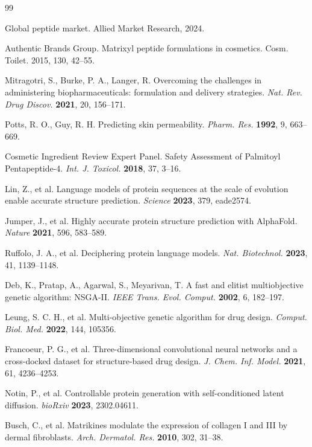 \documentclass[11pt,a4paper]{article}
\begin{document}
\begin{thebibliography}{99}

 Global peptide market. Allied Market Research, 2024.

 Authentic Brands Group. Matrixyl peptide formulations in cosmetics. Cosm. Toilet. 2015, 130, 42--55.

 Mitragotri, S., Burke, P. A., Langer, R. Overcoming the challenges in administering biopharmaceuticals: formulation and delivery strategies. \textit{Nat. Rev. Drug Discov.} \textbf{2021}, 20, 156--171.

 Potts, R. O., Guy, R. H. Predicting skin permeability. \textit{Pharm. Res.} \textbf{1992}, 9, 663--669.

 Cosmetic Ingredient Review Expert Panel. Safety Assessment of Palmitoyl Pentapeptide-4. \textit{Int. J. Toxicol.} \textbf{2018}, 37, 3--16.

 Lin, Z., et al. Language models of protein sequences at the scale of evolution enable accurate structure prediction. \textit{Science} \textbf{2023}, 379, eade2574.

 Jumper, J., et al. Highly accurate protein structure prediction with AlphaFold. \textit{Nature} \textbf{2021}, 596, 583--589.

 Ruffolo, J. A., et al. Deciphering protein language models. \textit{Nat. Biotechnol.} \textbf{2023}, 41, 1139--1148.

 Deb, K., Pratap, A., Agarwal, S., Meyarivan, T. A fast and elitist multiobjective genetic algorithm: NSGA-II. \textit{IEEE Trans. Evol. Comput.} \textbf{2002}, 6, 182--197.

 Leung, S. C. H., et al. Multi-objective genetic algorithm for drug design. \textit{Comput. Biol. Med.} \textbf{2022}, 144, 105356.

 Francoeur, P. G., et al. Three-dimensional convolutional neural networks and a cross-docked dataset for structure-based drug design. \textit{J. Chem. Inf. Model.} \textbf{2021}, 61, 4236--4253.

 Notin, P., et al. Controllable protein generation with self-conditioned latent diffusion. \textit{bioRxiv} \textbf{2023}, 2302.04611.

 Busch, C., et al. Matrikines modulate the expression of collagen I and III by dermal fibroblasts. \textit{Arch. Dermatol. Res.} \textbf{2010}, 302, 31--38.


\end{thebibliography}
\end{document}
